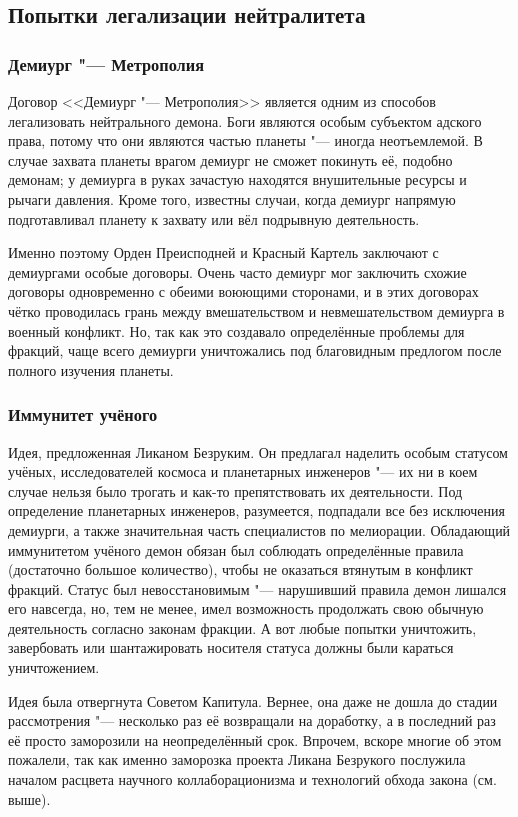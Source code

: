 \subsection{Попытки легализации нейтралитета}

\subsubsection{Демиург "--- Метрополия}

Договор <<Демиург "--- Метрополия>> является одним из способов легализовать нейтрального демона.
Боги являются особым субъектом адского права, потому что они являются частью планеты "--- иногда неотъемлемой.
В случае захвата планеты врагом демиург не сможет покинуть её, подобно демонам;
у демиурга в руках зачастую находятся внушительные ресурсы и рычаги давления.
Кроме того, известны случаи, когда демиург напрямую подготавливал планету к захвату или вёл подрывную деятельность.

Именно поэтому Орден Преисподней и Красный Картель заключают с демиургами особые договоры.
Очень часто демиург мог заключить схожие договоры одновременно с обеими воюющими сторонами, и в этих договорах чётко проводилась грань между вмешательством и невмешательством демиурга в военный конфликт.
Но, так как это создавало определённые проблемы для фракций, чаще всего демиурги уничтожались под благовидным предлогом после полного изучения планеты.

\subsubsection{Иммунитет учёного}

Идея, предложенная Ликаном Безруким.
Он предлагал наделить особым статусом учёных, исследователей космоса и планетарных инженеров "--- их ни в коем случае нельзя было трогать и как-то препятствовать их деятельности.
Под определение планетарных инженеров, разумеется, подпадали все без исключения демиурги, а также значительная часть специалистов по мелиорации.
Обладающий иммунитетом учёного демон обязан был соблюдать определённые правила (достаточно большое количество), чтобы не оказаться втянутым в конфликт фракций.
Статус был невосстановимым "--- нарушивший правила демон лишался его навсегда, но, тем не менее, имел возможность продолжать свою обычную деятельность согласно законам фракции.
А вот любые попытки уничтожить, завербовать или шантажировать носителя статуса должны были караться уничтожением.

Идея была отвергнута Советом Капитула.
Вернее, она даже не дошла до стадии рассмотрения "--- несколько раз её возвращали на доработку, а в последний раз её просто заморозили на неопределённый срок.
Впрочем, вскоре многие об этом пожалели, так как именно заморозка проекта Ликана Безрукого послужила началом расцвета научного коллаборационизма и технологий обхода закона (см. выше).

